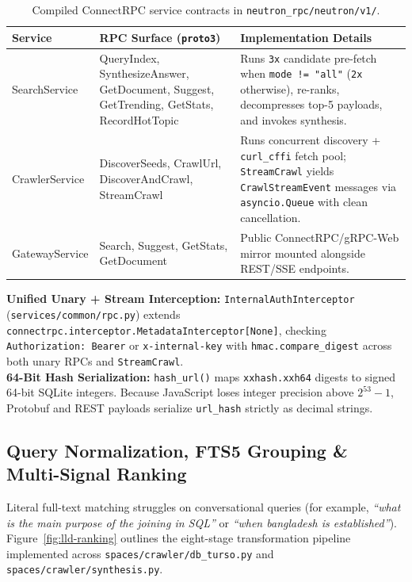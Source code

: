 \documentclass[10pt,a4paper]{article}
\begin{document}
\begin{table}[H]
\centering
\small
\renewcommand{\arraystretch}{1.28}
\begin{tabularx}{\textwidth}{@{}p{2.65cm} >{\ttfamily\scriptsize\raggedright\arraybackslash}p{4.85cm} >{\raggedright\arraybackslash}X@{}}
\toprule
\textbf{Service} & \textbf{RPC Surface (\texttt{proto3})} & \textbf{Implementation Details} \\
\midrule
SearchService & QueryIndex, SynthesizeAnswer, GetDocument, Suggest, GetTrending, GetStats, RecordHotTopic & Runs \texttt{3x} candidate pre-fetch when \texttt{mode != "all"} (\texttt{2x} otherwise), re-ranks, decompresses top-5 payloads, and invokes synthesis. \\
CrawlerService & DiscoverSeeds, CrawlUrl, DiscoverAndCrawl, StreamCrawl & Runs concurrent discovery + \texttt{curl\_cffi} fetch pool; \texttt{StreamCrawl} yields \texttt{CrawlStreamEvent} messages via \texttt{asyncio.Queue} with clean cancellation. \\
GatewayService & Search, Suggest, GetStats, GetDocument & Public ConnectRPC/gRPC-Web mirror mounted alongside REST/SSE endpoints. \\
\bottomrule
\end{tabularx}
\caption{Compiled ConnectRPC service contracts in \texttt{neutron\_rpc/neutron/v1/}.}
\end{table}

\begin{designnote}
\textbf{Unified Unary + Stream Interception:} \texttt{InternalAuthInterceptor} (\texttt{services/common/rpc.py}) extends \texttt{connectrpc.interceptor.MetadataInterceptor[None]}, checking \texttt{Authorization: Bearer} or \texttt{x-internal-key} with \texttt{hmac.compare\_digest} across both unary RPCs and \texttt{StreamCrawl}.\\[3pt]
\textbf{64-Bit Hash Serialization:} \texttt{hash\_url()} maps \texttt{xxhash.xxh64} digests to signed 64-bit SQLite integers. Because JavaScript loses integer precision above $2^{53}-1$, Protobuf and REST payloads serialize \texttt{url\_hash} strictly as decimal strings.
\end{designnote}

\subsection{Query Normalization, FTS5 Grouping \& Multi-Signal Ranking}
Literal full-text matching struggles on conversational queries (for example, \emph{``what is the main purpose of the joining in SQL''} or \emph{``when bangladesh is established''}). Figure~\ref{fig:lld-ranking} outlines the eight-stage transformation pipeline implemented across \texttt{spaces/crawler/db\_turso.py} and \texttt{spaces/crawler/synthesis.py}.
\end{document}
